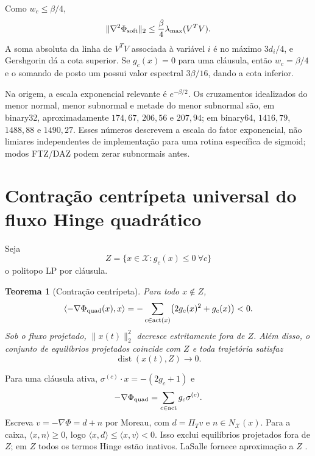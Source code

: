 \documentclass[11pt,a4paper]{article}
\newtheorem{theorem}{Teorema}[section]
\newcommand{\X}{\mathcal X}
\begin{document}
Como $w_c\le\beta/4$,
\[
\|\nabla^2\Phi_{\rm soft}\|_2\le\frac\beta4\lambda_{\max}(V^TV).
\]
A soma absoluta da linha de $V^TV$ associada à variável $i$ é no máximo $3d_i/4$, e Gershgorin dá a cota superior. Se $g_c(x)=0$ para uma cláusula, então $w_c=\beta/4$ e o somando de posto um possui valor espectral $3\beta/16$, dando a cota inferior.

Na origem, a escala exponencial relevante é $e^{-\beta/2}$. Os cruzamentos idealizados do menor normal, menor subnormal e metade do menor subnormal são, em binary32, aproximadamente $174{,}67$, $206{,}56$ e $207{,}94$; em binary64, $1416{,}79$, $1488{,}88$ e $1490{,}27$. Esses números descrevem a escala do fator exponencial, não limiares independentes de implementação para uma rotina específica de sigmoid; modos FTZ/DAZ podem zerar subnormais antes.

\section{Contração centrípeta universal do fluxo Hinge quadrático}
Seja
\[
Z=\{x\in\X:g_c(x)\le0\ \forall c\}
\]
o politopo LP por cláusula.

\begin{theorem}[Contração centrípeta]
Para todo $x\notin Z$,
\[
\langle-\nabla\Phi_{\rm quad}(x),x\rangle=-\sum_{c\in\operatorname{act}(x)}\bigl(2g_c(x)^2+g_c(x)\bigr)<0.
\]
Sob o fluxo projetado, $\|x(t)\|_2^2$ decresce estritamente fora de $Z$. Além disso, o conjunto de equilíbrios projetados coincide com $Z$ e toda trajetória satisfaz
\[
\operatorname{dist}(x(t),Z)\to0.
\]
\end{theorem}

\noindent Para uma cláusula ativa, $\sigma^{(c)}\cdot x=-(2g_c+1)$ e
\[
-\nabla\Phi_{\rm quad}=\sum_{c\in\operatorname{act}}g_c\sigma^{(c)}.
\]
Escreva $v=-\nabla\Phi=d+n$ por Moreau, com $d=\Pi_Tv$ e $n\in N_\X(x)$. Para a caixa, $\langle x,n\rangle\ge0$, logo $\langle x,d\rangle\le\langle x,v\rangle<0$. Isso exclui equilíbrios projetados fora de $Z$; em $Z$ todos os termos Hinge estão inativos. LaSalle fornece aproximação a $Z$ \cite{Brogliato,Nagurney}.
\end{document}
